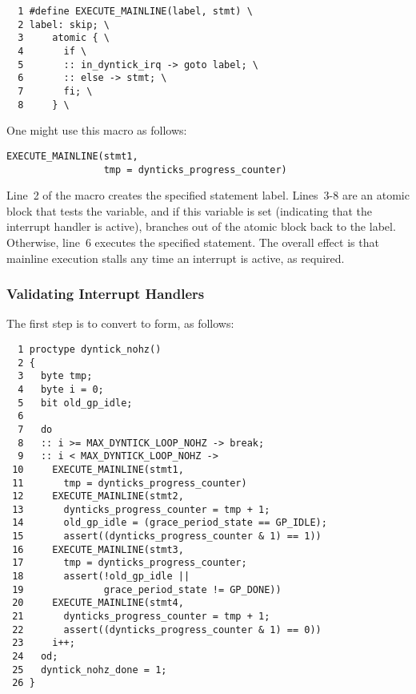 { \scriptsize
\begin{verbatim}
  1 #define EXECUTE_MAINLINE(label, stmt) \
  2 label: skip; \
  3     atomic { \
  4       if \
  5       :: in_dyntick_irq -> goto label; \
  6       :: else -> stmt; \
  7       fi; \
  8     } \
\end{verbatim}
}

One might use this macro as follows:

\vspace{5pt}
\begin{minipage}[t]{\columnwidth}
\scriptsize
\begin{verbatim}
EXECUTE_MAINLINE(stmt1,
                 tmp = dynticks_progress_counter)
\end{verbatim}
\end{minipage}
\vspace{5pt}

Line~2 of the macro creates the specified statement label.
Lines~3-8 are an atomic block that tests the 
variable, and if this variable is set (indicating that the interrupt
handler is active), branches out of the atomic block back to the
label.
Otherwise, line~6 executes the specified statement.
The overall effect is that mainline execution stalls any time an interrupt
is active, as required.

\subsubsection{Validating Interrupt Handlers}
\label{app:formal:Validating Interrupt Handlers}

The first step is to convert  to
\co{EXECUTE_MAINLINE()} form, as follows:

{ \scriptsize
\begin{verbatim}
  1 proctype dyntick_nohz()
  2 {
  3   byte tmp;
  4   byte i = 0;
  5   bit old_gp_idle;
  6
  7   do
  8   :: i >= MAX_DYNTICK_LOOP_NOHZ -> break;
  9   :: i < MAX_DYNTICK_LOOP_NOHZ ->
 10     EXECUTE_MAINLINE(stmt1,
 11       tmp = dynticks_progress_counter)
 12     EXECUTE_MAINLINE(stmt2,
 13       dynticks_progress_counter = tmp + 1;
 14       old_gp_idle = (grace_period_state == GP_IDLE);
 15       assert((dynticks_progress_counter & 1) == 1))
 16     EXECUTE_MAINLINE(stmt3,
 17       tmp = dynticks_progress_counter;
 18       assert(!old_gp_idle ||
 19              grace_period_state != GP_DONE))
 20     EXECUTE_MAINLINE(stmt4,
 21       dynticks_progress_counter = tmp + 1;
 22       assert((dynticks_progress_counter & 1) == 0))
 23     i++;
 24   od;
 25   dyntick_nohz_done = 1;
 26 }
\end{verbatim}
}

